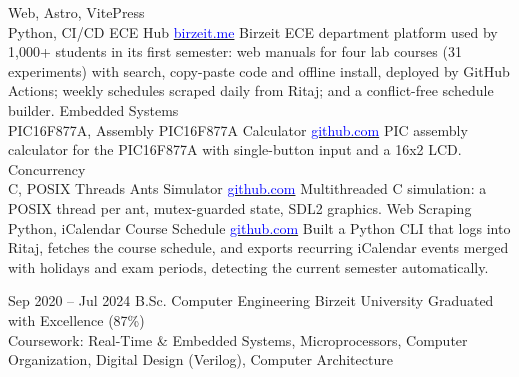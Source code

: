 \documentclass[9pt]{developercv} %
\begin{document}
\begin{entrylist}
    \entry
        {Web, Astro, VitePress \\ Python, CI/CD}
        {ECE Hub}
        {\href{https://birzeit.me}{\textcolor{blue}{birzeit.me}}}
        {Birzeit ECE department platform used by 1,000+ students in its first semester: web manuals for four lab courses (31 experiments) with search, copy-paste code and offline install, deployed by GitHub Actions; weekly schedules scraped daily from Ritaj; and a conflict-free schedule builder.}
    \entry
        {Embedded Systems\\ PIC16F877A, Assembly}
        {PIC16F877A Calculator}
        {\href{https://github.com/mabushelbaia/PIC16F877A-Calculator}{\textcolor{blue}{github.com}}}
        {PIC assembly calculator for the PIC16F877A with single-button input and a 16x2 LCD.}
    \entry
        {Concurrency\\ C, POSIX Threads}
        {Ants Simulator}
        {\href{https://github.com/mabushelbaia/Ants-Simulator}{\textcolor{blue}{github.com}}}
        {Multithreaded C simulation: a POSIX thread per ant, mutex-guarded state, SDL2 graphics.}
    \entry
        {Web Scraping \\ Python, iCalendar}
        {Course Schedule}
        {\href{https://github.com/mabushelbaia/Course-Schedule}{\textcolor{blue}{github.com}}}
        {Built a Python CLI that logs into Ritaj, fetches the course schedule, and exports recurring iCalendar events merged with holidays and exam periods, detecting the current semester automatically.}

\end{entrylist}

\vspace{-10 pt}
\begin{entrylist}
    \entry
		{Sep 2020 -- Jul 2024}
		{B.Sc. Computer Engineering}
		{Birzeit University}
		{Graduated with Excellence (87\%)\\
        Coursework: Real-Time \& Embedded Systems, Microprocessors, Computer Organization, Digital Design (Verilog), Computer Architecture
    }
\end{entrylist}
\end{document}
